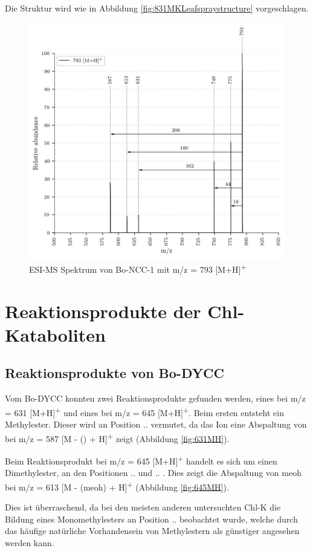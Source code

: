 Die Struktur wird wie in Abbildung \ref{fig:831MKLeafspraystructure} vorgeschlagen.

\begin{figure}[!htbp]
  \centering
  \includegraphics[width=\textwidth, height=0.6\textwidth]{figures/Kapitel7/Kataboliten/VWA_MS_793.png}
  \caption[ESI-MS Spektrum von Bo-NCC-1, Quelle: Autor]{ESI-MS Spektrum von Bo-NCC-1 mit m/z = 793 [M+H]\textsuperscript{+}}
  \label{fig:793MH}
\end{figure}



\pagebreak
\section{Reaktionsprodukte der Chl-Kataboliten}

\subsection{Reaktionsprodukte von Bo-DYCC}

Vom Bo-DYCC konnten zwei Reaktionsprodukte gefunden werden, eines bei m/z = 631 [M+H]\textsuperscript{+} und eines bei m/z = 645 [M+H]\textsuperscript{+}. Beim ersten entsteht ein Methylester. Dieser wird an Position .. vermutet, da das Ion eine Abspaltung von  bei m/z = 587 [M - () + H]\textsuperscript{+} zeigt (Abbildung \ref{fig:631MH}). 

Beim Reaktionsprodukt bei m/z = 645 [M+H]\textsuperscript{+} handelt es sich um einen Dimethylester, an den Positionen .. und .. .  Dies zeigt die Abspaltung von \gls{meoh} bei m/z = 613 [M - (\gls{meoh}) + H]\textsuperscript{+} (Abbildung \ref{fig:645MH}). 

Dies ist überraschend, da bei den meisten anderen untersuchten \gls{Chl-K} die Bildung eines Monomethylesters an Position .. beobachtet wurde, welche durch das häufige natürliche Vorhandensein von Methylestern als günstiger angesehen werden kann.

